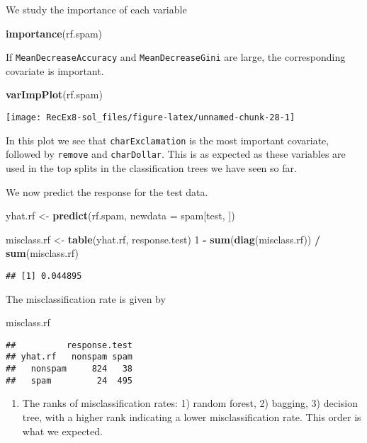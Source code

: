 \documentclass[
]{article}
\newenvironment{Shaded}{\begin{snugshade}}{\end{snugshade}}
\newcommand{\AttributeTok}[1]{\textcolor[rgb]{0.13,0.29,0.53}{#1}}
\newcommand{\DecValTok}[1]{\textcolor[rgb]{0.00,0.00,0.81}{#1}}
\newcommand{\FunctionTok}[1]{\textcolor[rgb]{0.13,0.29,0.53}{\textbf{#1}}}
\newcommand{\NormalTok}[1]{#1}
\newcommand{\OtherTok}[1]{\textcolor[rgb]{0.56,0.35,0.01}{#1}}
\newcommand{\SpecialCharTok}[1]{\textcolor[rgb]{0.81,0.36,0.00}{\textbf{#1}}}
\providecommand{\tightlist}{%
  \setlength{\itemsep}{0pt}\setlength{\parskip}{0pt}}
\begin{document}
We study the importance of each variable

\begin{Shaded}
\begin{Highlighting}[]
\FunctionTok{importance}\NormalTok{(rf.spam)}
\end{Highlighting}
\end{Shaded}

If \texttt{MeanDecreaseAccuracy} and \texttt{MeanDecreaseGini} are
large, the corresponding covariate is important.

\begin{Shaded}
\begin{Highlighting}[]
\FunctionTok{varImpPlot}\NormalTok{(rf.spam)}
\end{Highlighting}
\end{Shaded}

\texttt{[image: RecEx8-sol\_files/figure-latex/unnamed-chunk-28-1]}

In this plot we see that \texttt{charExclamation} is the most important
covariate, followed by \texttt{remove} and \texttt{charDollar}. This is
as expected as these variables are used in the top splits in the
classification trees we have seen so far.

We now predict the response for the test data.

\begin{Shaded}
\begin{Highlighting}[]
\NormalTok{yhat.rf }\OtherTok{\textless{}{-}} \FunctionTok{predict}\NormalTok{(rf.spam, }\AttributeTok{newdata =}\NormalTok{ spam[test, ])}

\NormalTok{misclass.rf }\OtherTok{\textless{}{-}} \FunctionTok{table}\NormalTok{(yhat.rf, response.test)}
\DecValTok{1} \SpecialCharTok{{-}} \FunctionTok{sum}\NormalTok{(}\FunctionTok{diag}\NormalTok{(misclass.rf)) }\SpecialCharTok{/} \FunctionTok{sum}\NormalTok{(misclass.rf)}
\end{Highlighting}
\end{Shaded}

\begin{verbatim}
## [1] 0.044895
\end{verbatim}

The misclassification rate is given by

\begin{Shaded}
\begin{Highlighting}[]
\NormalTok{misclass.rf}
\end{Highlighting}
\end{Shaded}

\begin{verbatim}
##          response.test
## yhat.rf   nonspam spam
##   nonspam     824   38
##   spam         24  495
\end{verbatim}

\begin{enumerate}
\def\labelenumi{\alph{enumi})}
\setcounter{enumi}{7}
\tightlist
\item
  The ranks of misclassification rates: 1) random forest, 2) bagging, 3)
  decision tree, with a higher rank indicating a lower misclassification
  rate. This order is what we expected.
\end{enumerate}
\end{document}
